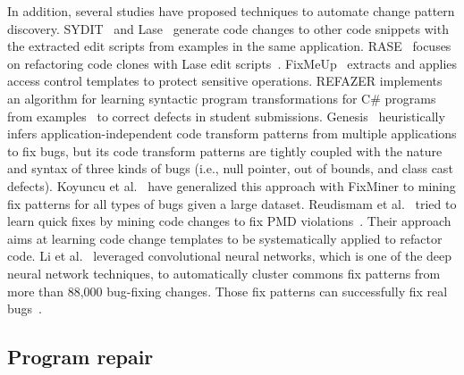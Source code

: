 In addition, several studies have proposed techniques to automate change pattern discovery.
SYDIT~\cite{meng2011systematic} and Lase~\cite{meng2013lase} generate code changes to other code snippets with the extracted edit scripts from examples in the same application. 
RASE~\cite{meng2015does} focuses on refactoring code clones with Lase edit scripts~\cite{meng2013lase}. 
FixMeUp~\cite{son2011rolecast} extracts and applies access control templates to protect sensitive operations. 
REFAZER implements an algorithm for learning syntactic program transformations for C\# programs from examples~\cite{rolim2017learning} to correct defects in student submissions. 
Genesis~\cite{long2017automatic} heuristically infers application-independent code transform patterns from multiple applications to fix bugs, but its code transform patterns are tightly coupled with the nature and syntax of three kinds of bugs (i.e., null pointer, out of bounds, and class cast defects). 
Koyuncu et al.~\cite{koyuncu2018fixminer} have generalized this approach with FixMiner to mining fix patterns for all types of bugs given a large dataset. 
Reudismam et al.~\cite{rolim2018learning} tried to learn quick fixes by mining code changes to fix PMD violations~\cite{pmd}. Their approach aims at learning code change templates to be systematically applied to refactor code. 
Li et al.~\cite{liu_mining_2018} leveraged convolutional neural networks, which is one of the deep neural network techniques,
to automatically cluster commons fix patterns from more than 88,000 bug-fixing changes. Those fix patterns
can successfully fix real bugs~\cite{liu_avatar_2019}.





\subsection{Program repair}

